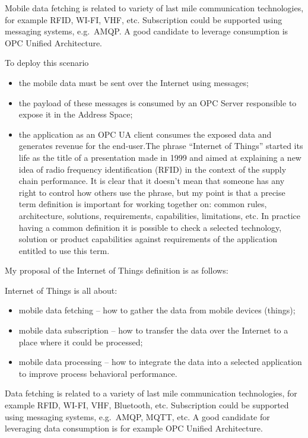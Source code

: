 \documentclass[
]{article}
\providecommand{\tightlist}{%
  \setlength{\itemsep}{0pt}\setlength{\parskip}{0pt}}
\begin{document}
Mobile data fetching is related to variety of last mile communication
technologies, for example RFID, WI-FI, VHF, etc. Subscription could be
supported using messaging systems, e.g.~AMQP. A good candidate to
leverage consumption is OPC Unified Architecture.

To deploy this scenario

\begin{itemize}
\tightlist
\item
  the mobile data must be sent over the Internet using messages;
\item
  the payload of these messages is consumed by an OPC Server responsible
  to expose it in the Address Space;
\item
  the application as an OPC UA client consumes the exposed data and
  generates revenue for the end-user.The phrase ``Internet of Things''
  started its life as the title of a presentation made in 1999 and aimed
  at explaining a new idea of radio frequency identification (RFID) in
  the context of the supply chain performance. It is clear that it
  doesn't mean that someone has any right to control how others use the
  phrase, but my point is that a precise term definition is important
  for working together on: common rules, architecture, solutions,
  requirements, capabilities, limitations, etc. In practice having a
  common definition it is possible to check a selected technology,
  solution or product capabilities against requirements of the
  application entitled to use this term.
\end{itemize}

My proposal of the Internet of Things definition is as follows:

Internet of Things is all about:

\begin{itemize}
\tightlist
\item
  mobile data fetching -- how to gather the data from mobile devices
  (things);
\item
  mobile data subscription -- how to transfer the data over the Internet
  to a place where it could be processed;
\item
  mobile data processing -- how to integrate the data into a selected
  application to improve process behavioral performance.
\end{itemize}

Data fetching is related to a variety of last mile communication
technologies, for example RFID, WI-FI, VHF, Bluetooth, etc. Subscription
could be supported using messaging systems, e.g.~AMQP, MQTT, etc. A good
candidate for leveraging data consumption is for example OPC Unified
Architecture.
\end{document}
